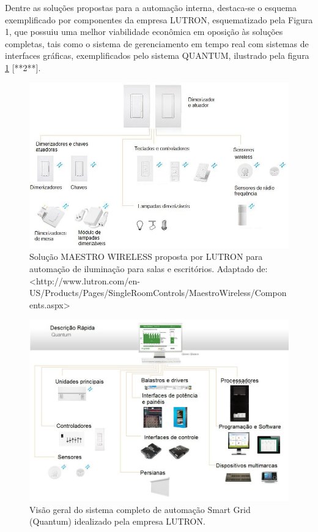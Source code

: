 Dentre as soluções propostas para a automação interna, destaca-se o esquema exemplificado por componentes da empresa LUTRON, esquematizado pela Figura 1, que possuiu uma melhor viabilidade econômica em oposição às soluções completas, tais como o sistema de gerenciamento em tempo real com sistemas de interfaces gráficas, exemplificados pelo sistema QUANTUM, ilustrado pela figura \ref{fig:maestrowireless} [**2**]. 
\begin{figure}[!h]
	\centering
	\includegraphics[width=1.0\textwidth]{figuras/maestroWireless.jpeg}
	\caption{Solução MAESTRO WIRELESS proposta por LUTRON para automação de iluminação para salas e  escritórios. Adaptado de: <http://www.lutron.com/en-US/Products/Pages/SingleRoomControls/MaestroWireless/Components.aspx>}
	\label{fig:maestrowireless}
\end{figure}

\begin{figure}[!h]
	\centering
	\includegraphics[width=1.0\textwidth]{figuras/sistemaQuantum.jpeg}
	\caption{Visão geral do sistema completo de automação Smart Grid (Quantum) idealizado pela empresa LUTRON.}
	\label{fig:sistemaquantum}
\end{figure}

